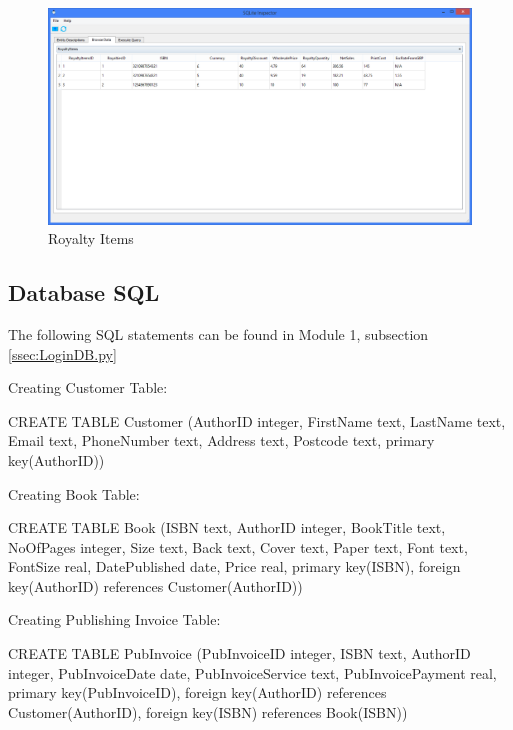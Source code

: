 \begin{figure}[H]
    \caption{Royalty Items} \label{fig:Royalty Items}
    \includegraphics[width=\textwidth]{./Maintenance/DatabaseTables/RoyaltyItems.png}
\end{figure}

\subsection{Database SQL}

The following SQL statements can be found in Module 1,  subsection \ref{ssec:LoginDB.py}

Creating Customer Table:
\begin{sql}
CREATE TABLE Customer 
                 (AuthorID integer,
                 FirstName text,
                 LastName text,
                 Email text,
                 PhoneNumber text,
                 Address text,
                 Postcode text,
                 primary key(AuthorID))
\end{sql}

Creating Book Table:
\begin{sql}
CREATE TABLE Book 
                 (ISBN text,
                 AuthorID integer,
                 BookTitle text,
                 NoOfPages integer,
                 Size text,
                 Back text,
                 Cover text,
                 Paper text,
                 Font text,
                 FontSize real,
                 DatePublished date,
                 Price real,
                 primary key(ISBN),
                 foreign key(AuthorID) references Customer(AuthorID))
\end{sql}

Creating Publishing Invoice Table:
\begin{sql}
CREATE TABLE PubInvoice 
                 (PubInvoiceID integer,
                 ISBN text,
                 AuthorID integer,
                 PubInvoiceDate date,
                 PubInvoiceService text,
                 PubInvoicePayment real,
                 primary key(PubInvoiceID),
                 foreign key(AuthorID) references Customer(AuthorID),
                 foreign key(ISBN) references Book(ISBN))
\end{sql}

